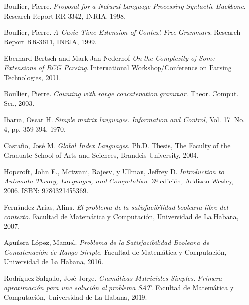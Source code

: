 \documentclass[12pt]{article}
\begin{document}
\begin{thebibliography}{99}
    
    Boullier, Pierre.
    \textit{Proposal for a Natural Language Processing Syntactic Backbone}.
    Research Report RR-3342, INRIA, 1998.
    
    Boullier, Pierre.
    \textit{A Cubic Time Extension of Context-Free Grammars}.
    Research Report RR-3611, INRIA, 1999.
    
    Eberhard Bertsch and Mark-Jan Nederhof
    \textit{On the Complexity of Some Extensions of RCG Parsing}.
    International Workshop/Conference on Parsing Technologies, 2001.
    
    Boullier, Pierre.
    \textit{Counting with range concatenation grammar}.
    Theor. Comput. Sci., 2003.
    
    Ibarra, Oscar H.
    \textit{Simple matrix languages}.
    \textit{Information and Control}, Vol. 17, No. 4, pp. 359-394, 1970.
    
    Castaño, José M.
    \textit{Global Index Languages}.
    Ph.D. Thesis, The Faculty of the Graduate School of Arts and Sciences, Brandeis University, 2004.
    
    Hopcroft, John E., Motwani, Rajeev, y Ullman, Jeffrey D.
    \textit{Introduction to Automata Theory, Languages, and Computation}.
    3ª edición, Addison-Wesley, 2006. ISBN: 9780321455369.
    
    Fernández Arias, Alina.
    \textit{El problema de la satisfacibilidad booleana libre del contexto}.
    Facultad de Matemática y Computación, Universidad de La Habana, 2007.
    
    Aguilera López, Manuel.
    \textit{Problema de la Satisfacibilidad Booleana de Concatenación de Rango Simple}.
    Facultad de Matemática y Computación, Universidad de La Habana, 2016.
    
    Rodríguez Salgado, José Jorge.
    \textit{Gramáticas Matriciales Simples. Primera aproximación para una solución al problema SAT}.
    Facultad de Matemática y Computación, Universidad de La Habana, 2019.
    
\end{thebibliography}
\end{document}
